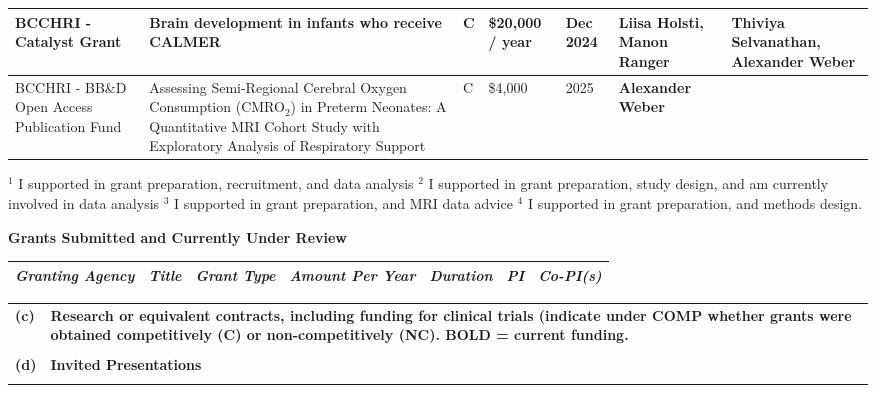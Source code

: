 \documentclass[11pt,notitlepage,english]{report}
\begin{document}
\begin{longtable}{|L{2.7cm}|L{4cm}|L{1cm}|L{2cm}|L{1.7cm}|L{2cm}|L{3cm}|}
  \hline
  \textbf{BCCHRI - Catalyst Grant} & \textbf{Brain development in infants who receive CALMER} & \textbf{C} & \textbf{\$20,000 / year} & \textbf{Dec 2024} & \textbf{Liisa Holsti, Manon Ranger} & \textbf{Thiviya Selvanathan,} \textbf{Alexander Weber} \\
  \hline
  BCCHRI - BB\&D Open Access Publication Fund & Assessing Semi-Regional Cerebral Oxygen Consumption (CMRO$_{2}$) in Preterm Neonates: A Quantitative MRI Cohort Study with Exploratory Analysis of Respiratory Support & C & \$4,000 & 2025 & \textbf{Alexander Weber} & \\
  \hline
\end{longtable}
\setlength\LTleft{0cm}
\setlength\LTright{0cm}
\noindent $^{1}$ I supported in grant preparation, recruitment, and data analysis \newline
$^{2}$ I supported in grant preparation, study design, and am currently involved in data analysis \newline
$^{3}$ I supported in grant preparation, and MRI data advice \newline
$^{4}$ I supported in grant preparation, and methods design.
\vspace{10pt}

\textbf{Grants Submitted and Currently Under Review}

\begin{longtable}{|L{2cm}|L{3.6cm}|L{1cm}|L{2cm}|L{1.7cm}|L{2cm}|L{2cm}|}
  \hline
  \textit{\textbf{Granting Agency}} & \textit{\textbf{Title}} & \textit{\textbf{Grant Type}} & \textit{\textbf{Amount Per Year}} & \textit{\textbf{Duration}} & \textit{\textbf{PI}} & \textit{\textbf{Co-PI(s)}} \\
  \hline
\end{longtable}

\begin{tabular}{L{.5cm} L{15.6cm}}
  \\
  \textbf{(c)} & \textbf{Research or equivalent contracts, including funding for clinical trials (indicate under COMP whether grants were obtained competitively (C) or non-competitively (NC). BOLD = current funding.} \\
  \\
  \textbf{(d)} & \textbf{Invited Presentations} \\
  \\
\end{tabular}
\end{document}
